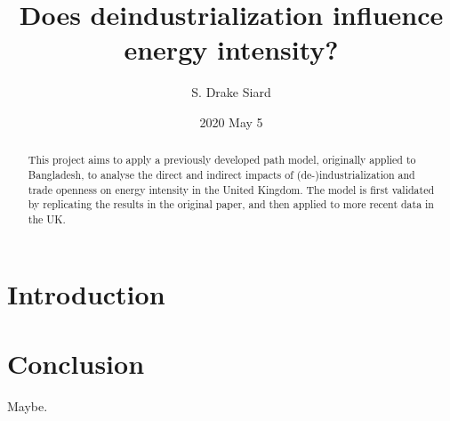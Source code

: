\documentclass[11pt]{article}
\title{\textbf{Does deindustrialization influence energy intensity?}}
\author{S. Drake Siard}
\date{2020 May 5}
\begin{document}
\maketitle

\begin{abstract}
This project aims to apply a previously developed path model, originally applied to Bangladesh, to analyse the direct and indirect impacts of (de-)industrialization and trade openness on energy intensity in the United Kingdom. 
The model is first validated by replicating the results in the original paper, and then applied to more recent data in the UK.
\end{abstract}


\section{Introduction}
\cite{panHowIndustrializationTrade2019}

\section{Conclusion}
Maybe.


\end{document}
